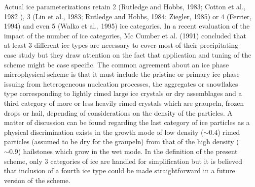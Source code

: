 Actual ice parameterizations retain 2 (Rutledge and Hobbs, 1983; Cotton et al.,
1982\footnotemark
%
%
), 3 (Lin et al., 1983; Rutledge and Hobbs, 1984; Ziegler, 1985) or 4
(Ferrier, 1994) and even 5 (Walko et al., 1995) ice categories. In a recent
evaluation of the impact of the number of ice categories, Mc Cumber et al.
(1991) concluded that at least 3 different ice types are necessary to cover most
of their precipitating case study but they
draw attention on the fact that application and tuning of the scheme might be
case specific. The common agreement about an ice phase microphysical scheme is
that it must include the pristine or primary ice phase issuing from
heterogeneous nucleation processes, the aggregates or snowflakes type
corresponding to lightly rimed large ice crystals or dry assemblages
and a third category of more or less heavily rimed crystals which are
graupeln, frozen drops or hail, depending of considerations on the density of
the particles. A matter of discussion can be found regarding the last category
of ice particles as a physical discrimination exists in the growth mode of
low density ($\sim 0.4$) rimed particles (assumed to be dry for the graupeln)
from that of the high density ($\sim 0.9$) hailstones which grow in the wet
mode. In the definition of the present scheme, only 3 categories of ice are
handled for simplification but it is believed that inclusion of a fourth ice
type could be made straightforward in a future version of the scheme.

